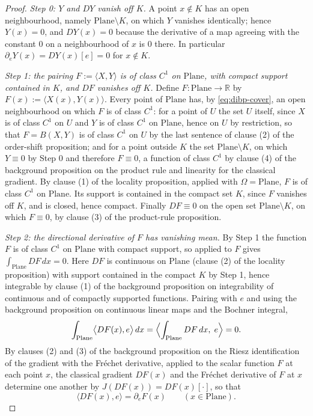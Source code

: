 \begin{proof}
\medskip\noindent\emph{Step 0: $Y$ and $DY$ vanish off $K$.}
A point $x\notin K$ has an open neighbourhood, namely $\mathrm{Plane}\setminus K$, on which $Y$
vanishes identically; hence $Y(x)=0$, and $DY(x)=0$ because the derivative of a map agreeing
with the constant $0$ on a neighbourhood of $x$ is $0$ there.  In particular
$\partial_eY(x)=DY(x)[e]=0$ for $x\notin K$.

\medskip\noindent\emph{Step 1: the pairing $F:=\langle X,Y\rangle$ is of class $C^{1}$ on
$\mathrm{Plane}$, with compact support contained in $K$, and $DF$ vanishes off $K$.}
Define $F\colon\mathrm{Plane}\to\mathbb{R}$ by $F(x):=\langle X(x),Y(x)\rangle$.  Every point of
$\mathrm{Plane}$ has, by \eqref{eq:dibp-cover}, an open neighbourhood on which $F$ is of class
$C^{1}$: for a point of $U$ the set $U$ itself, since $X$ is of class $C^{1}$ on $U$ and $Y$ is
of class $C^{1}$ on $\mathrm{Plane}$, hence on $U$ by restriction, so that $F=B(X,Y)$ is of
class $C^{1}$ on $U$ by the last sentence of clause (2) of the order-shift proposition; and for a point outside $K$ the set $\mathrm{Plane}\setminus K$, on
which $Y\equiv0$ by Step 0 and therefore $F\equiv0$, a function of class $C^{1}$ by clause (4)
of the background proposition on the product rule and linearity for the classical gradient.  By
clause (1) of the locality proposition, applied with $\Omega=\mathrm{Plane}$, $F$ is of class
$C^{1}$ on $\mathrm{Plane}$.  Its support is contained in the compact set $K$, since $F$
vanishes off $K$, and is closed, hence compact.  Finally $DF\equiv0$ on the open set
$\mathrm{Plane}\setminus K$, on which $F\equiv0$, by clause (3) of the product-rule
proposition.

\medskip\noindent\emph{Step 2: the directional derivative of $F$ has vanishing mean.}
By Step 1 the function $F$ is of class $C^{1}$ on $\mathrm{Plane}$ with compact support, so
 applied to $F$ gives
$\int_{\mathrm{Plane}}DF\,dx=0$.  Here $DF$ is continuous on $\mathrm{Plane}$ (clause (2) of the
locality proposition) with support contained in the compact $K$ by Step 1, hence integrable by
clause (1) of the background proposition on integrability of continuous and of compactly
supported functions.  Pairing with $e$ and using the background proposition on continuous linear
maps and the Bochner integral,
\begin{equation}\label{eq:dibp-zero}
  \int_{\mathrm{Plane}}\bigl\langle DF(x),e\bigr\rangle\,dx
  =\Bigl\langle\int_{\mathrm{Plane}}DF\,dx,\;e\Bigr\rangle=0 .
\end{equation}
By clauses (2) and (3) of the background proposition on the Riesz identification of the
gradient with the Fr\'echet derivative, applied to the scalar function $F$ at each point $x$,
the classical gradient $DF(x)$ and the Fr\'echet derivative of $F$ at $x$ determine one
another by $J(DF(x))=DF(x)[\cdot]$, so that
\begin{equation}\label{eq:dibp-riesz}
  \bigl\langle DF(x),e\bigr\rangle=\partial_eF(x)\qquad(x\in\mathrm{Plane}).
\end{equation}


\end{proof}

